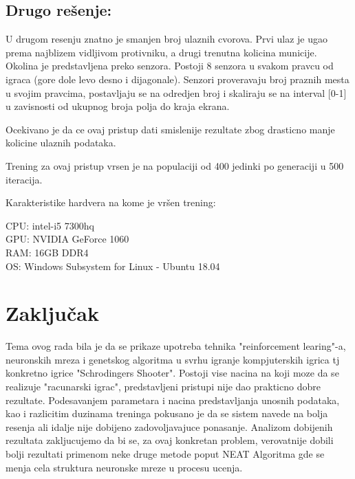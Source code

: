 \documentclass[a4paper]{article}
\begin{document}
\subsection {Drugo rešenje:}
\par U drugom resenju znatno je smanjen broj ulaznih cvorova. Prvi ulaz je ugao prema najblizem vidljivom protivniku, a drugi trenutna kolicina municije. Okolina je predstavljena preko senzora. Postoji 8 senzora u svakom pravcu od igraca (gore dole levo desno i dijagonale).  Senzori proveravaju broj praznih mesta u svojim pravcima,  postavljaju se na odredjen broj i skaliraju se na interval [0-1] u zavisnosti od ukupnog broja polja do kraja ekrana. 

Ocekivano je da ce ovaj pristup dati smislenije rezultate zbog drasticno manje kolicine ulaznih podataka.

Trening za ovaj pristup vrsen je na populaciji od 400 jedinki po generaciji u 500 iteracija.
\newline
\begin{tcolorbox}
\begin {center}
Karakteristike hardvera na kome je vršen trening: \\
\end {center}
CPU: intel-i5 7300hq \\
GPU: NVIDIA GeForce 1060 \\
RAM: 16GB DDR4 \\
OS: Windows Subsystem for Linux - Ubuntu 18.04 \\
\end{tcolorbox}


 \newpage
\section{Zaključak}
\label{sec:zakljucak}

\par Tema ovog rada bila je da se prikaze upotreba tehnika "reinforcement learing"-a,  neuronskih mreza i genetskog algoritma u svrhu igranje kompjuterskih igrica tj konkretno igrice "Schrodingers Shooter". Postoji vise nacina na koji moze da se realizuje "racunarski igrac",  predstavljeni pristupi nije dao prakticno dobre rezultate. Podesavanjem parametara i nacina predstavljanja unosnih podataka, kao i razlicitim duzinama treninga pokusano je da se sistem navede na bolja resenja ali idalje nije dobijeno zadovoljavajuce ponasanje. Analizom dobijenih rezultata zakljucujemo da bi se, za ovaj konkretan problem, verovatnije dobili bolji rezultati primenom neke druge metode poput NEAT Algoritma gde se menja cela struktura neuronske mreze u procesu ucenja.


 

\end{document}
